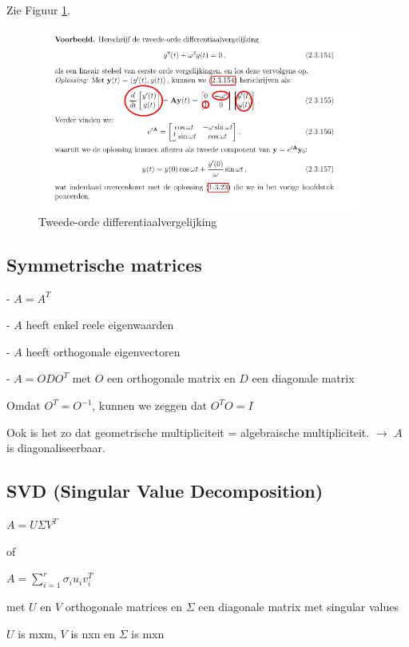 \documentclass[a4paper]{report}
\begin{document}
Zie Figuur \ref{fig:diff2}.

\begin{figure}[H]
	\begin{center}
		\includegraphics[width=0.95\textwidth]{./images/something.png}
	\end{center}
	\caption{Tweede-orde differentiaalvergelijking}
	\label{fig:diff2}
\end{figure}

\subsection{Symmetrische matrices}

- $A = A^T$

- $A$ heeft enkel reele eigenwaarden

- $A$ heeft orthogonale eigenvectoren

- $A = ODO^T$ met $O$ een orthogonale matrix en $D$ een diagonale matrix

Omdat $O^T = O^{-1}$, kunnen we zeggen dat $O^T O = I$

Ook is het zo dat geometrische multipliciteit = algebraische multipliciteit. $\rightarrow$ $A$ is diagonaliseerbaar.

\subsection{SVD (Singular Value Decomposition)}

$A = U \Sigma V^T$

of

$A = \sum_{i=1}^{r} \sigma_i u_i v_i^T$


met $U$ en $V$ orthogonale matrices en $\Sigma$ een diagonale matrix met singular values

$U$ is mxm, $V$ is nxn en $\Sigma$ is mxn
\end{document}
